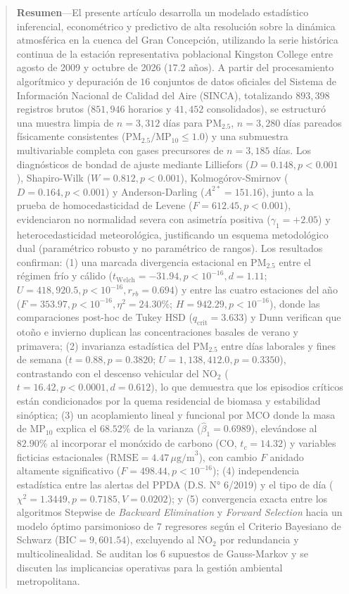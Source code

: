\documentclass[10pt,twocolumn,a4paper]{article}
\begin{document}
{  \begin{quotation}
    \small
    \noindent\textbf{\color{navyblue}Resumen}---El presente artículo desarrolla un modelado estadístico inferencial, econométrico y predictivo de alta resolución sobre la dinámica atmosférica en la cuenca del Gran Concepción, utilizando la serie histórica continua de la estación representativa poblacional Kingston College entre agosto de 2009 y octubre de 2026 ($17.2\text{ años}$). A partir del procesamiento algorítmico y depuración de $16$ conjuntos de datos oficiales del Sistema de Información Nacional de Calidad del Aire (SINCA), totalizando $893,398$ registros brutos ($851,946$ horarios y $41,452$ consolidados), se estructuró una muestra limpia de $n = 3,312$ días para $\text{PM}_{2.5}$, $n = 3,280$ días pareados físicamente consistentes ($\text{PM}_{2.5}/\text{MP}_{10} \le 1.0$) y una submuestra multivariable completa con gases precursores de $n = 3,185$ días. Los diagnósticos de bondad de ajuste mediante Lilliefors ($D = 0.148, p < 0.001$), Shapiro-Wilk ($W = 0.812, p < 0.001$), Kolmogórov-Smirnov ($D = 0.164, p < 0.001$) y Anderson-Darling ($A^{2*} = 151.16$), junto a la prueba de homocedasticidad de Levene ($F = 612.45, p < 0.001$), evidenciaron no normalidad severa con asimetría positiva ($\gamma_1 = +2.05$) y heterocedasticidad meteorológica, justificando un esquema metodológico dual (paramétrico robusto y no paramétrico de rangos). Los resultados confirman: (1) una marcada divergencia estacional en $\text{PM}_{2.5}$ entre el régimen frío y cálido ($t_{\text{Welch}} = -31.94, p < 10^{-16}, d = 1.11$; $U = 418,920.5, p < 10^{-16}, r_{rb} = 0.694$) y entre las cuatro estaciones del año ($F = 353.97, p < 10^{-16}, \eta^2 = 24.30\%$; $H = 942.29, p < 10^{-16}$), donde las comparaciones post-hoc de Tukey HSD ($q_{\text{crit}} = 3.633$) y Dunn verifican que otoño e invierno duplican las concentraciones basales de verano y primavera; (2) invarianza estadística del $\text{PM}_{2.5}$ entre días laborales y fines de semana ($t = 0.88, p = 0.3820$; $U = 1,138,412.0, p = 0.3350$), contrastando con el descenso vehicular del $\text{NO}_2$ ($t = 16.42, p < 0.0001, d = 0.612$), lo que demuestra que los episodios críticos están condicionados por la quema residencial de biomasa y estabilidad sinóptica; (3) un acoplamiento lineal y funcional por MCO donde la masa de $\text{MP}_{10}$ explica el $68.52\%$ de la varianza ($\hat{\beta}_1 = 0.6989$), elevándose al $82.90\%$ al incorporar el monóxido de carbono ($\text{CO}$, $t_c = 14.32$) y variables ficticias estacionales ($\text{RMSE} = 4.47\,\mu\text{g/m}^3$), con cambio $F$ anidado altamente significativo ($F = 498.44, p < 10^{-16}$); (4) independencia estadística entre las alertas del PPDA (D.S. N° 6/2019) y el tipo de día ($\chi^2 = 1.3449, p = 0.7185, V = 0.0202$); y (5) convergencia exacta entre los algoritmos Stepwise de \textit{Backward Elimination} y \textit{Forward Selection} hacia un modelo óptimo parsimonioso de $7$ regresores según el Criterio Bayesiano de Schwarz ($\text{BIC} = 9,601.54$), excluyendo al $\text{NO}_2$ por redundancia y multicolinealidad. Se auditan los $6$ supuestos de Gauss-Markov y se discuten las implicancias operativas para la gestión ambiental metropolitana.\par

\end{quotation}}
\end{document}
